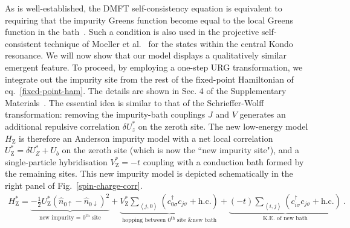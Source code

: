 \documentclass{iopart}
\begin{document}
As is well-established, the DMFT self-consistency equation is equivalent to requiring that the impurity Greens function become equal to the local Greens function in the bath~\cite{georges1996}.
Such a condition is also used in the projective self-consistent technique of Moeller et al.~\cite{moeller_1995} for the states within the central Kondo resonance.
We will now show that our model displays a qualitatively similar emergent feature.
To proceed, by employing a one-step URG transformation, we integrate out the impurity site from the rest of the fixed-point Hamiltonian of eq.~\eqref{fixed-point-ham}.
The details are shown in Sec. 4 of the Supplementary Materials~\cite{supp_mat}. The essential idea is similar to that of the Schrieffer-Wolff transformation: removing the impurity-bath couplings \(J\) and \(V\) generates an additional repulsive correlation \(\delta U_z^* \) on the zeroth site. The new low-energy model \(H_\text{Z}\) is therefore an Anderson impurity model with a net local correlation \(U_\text{Z}^* = \delta U_Z^* + U_b\) on the zeroth site (which is now the ``new impurity site"), and a single-particle hybridisation \(V_\text{Z}^* = -t\) coupling with a conduction bath formed by the remaining sites. This new impurity model is depicted schematically in the right panel of Fig.~\eqref{spin-charge-corr}.
\begin{eqnarray}
	H_\text{Z}^*  = \underbrace{-\frac{1}{2}U_\text{Z}^*\left(\hat n_{0\uparrow} - \hat n_{0\downarrow}\right)^2}_\text{new impurity = \(0^\text{th}\) site} + \underbrace{V_\text{Z}^*\sum_{\left<j,0 \right>}\left(c^\dagger_{0\sigma}c_{j\sigma} + \text{h.c.}\right)}_\text{hopping between \(0^\text{th}\) site \& new bath} + \underbrace{(-t) \sum_{\left<i,j \right>}\left(c^\dagger_{i\sigma}c_{j\sigma} + \text{h.c.}\right)}_\text{K.E. of new bath}~.
\end{eqnarray}
\end{document}
